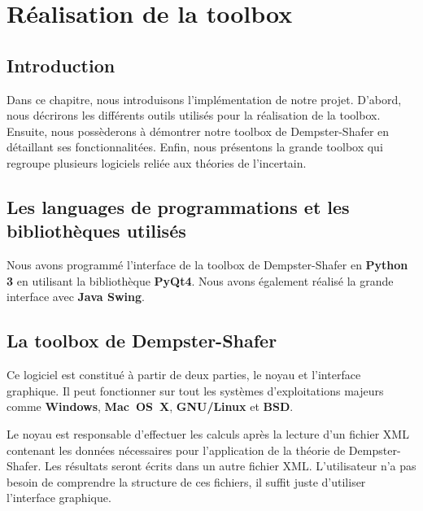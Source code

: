 \chapter{Réalisation de la toolbox}

\section{Introduction}

Dans ce chapitre, nous introduisons l'implémentation de notre projet. D'abord, nous 
décrirons les différents outils utilisés pour la réalisation de la toolbox. Ensuite,
nous possèderons à démontrer notre toolbox de Dempster-Shafer en détaillant ses
fonctionnalitées. Enfin, nous présentons la grande toolbox qui regroupe plusieurs
logiciels reliée aux théories de l'incertain.

\section{Les languages de programmations et les bibliothèques utilisés}

Nous avons programmé l'interface de la toolbox de Dempster-Shafer en \textbf{Python 3}
en utilisant la bibliothèque \textbf{PyQt4}. Nous avons également réalisé la grande
interface avec \textbf{Java Swing}.

\section{La toolbox de Dempster-Shafer}

Ce logiciel est constitué à partir de deux parties, le noyau et l'interface graphique.
Il peut fonctionner sur tout les systèmes d'exploitations majeurs comme \textbf{Windows},
\textbf{Mac~OS~X}, \textbf{GNU/Linux} et \textbf{BSD}.

Le noyau est responsable d'effectuer les calculs après la lecture d'un fichier XML
contenant les données nécessaires pour l'application de la théorie de Dempster-Shafer.
Les résultats seront écrits dans un autre fichier XML. L'utilisateur n'a pas besoin
de comprendre la structure de ces fichiers, il suffit juste d'utiliser l'interface
graphique.

